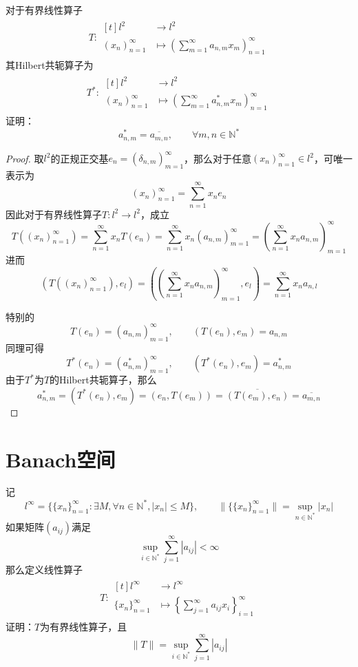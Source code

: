 \documentclass[lang = cn, scheme = chinese, 10pt]{elegantbook}
\newcommand{\N}{\mathbb{N}}  %
\begin{document}
\begin{proposition}
	对于有界线性算子
	\nonumber\begin{align}
		T:\begin{aligned}[t]
			l^2 &\longrightarrow l^2\\
			(x_n)_{n=1}^{\infty} &\longmapsto \left(\sum_{m=1}^{\infty}a_{n,m}x_m\right)_{n=1}^{\infty}
		\end{aligned}
	\end{align}
	其Hilbert共轭算子为
	\nonumber\begin{align}
		T^*:\begin{aligned}[t]
			l^2 &\longrightarrow l^2\\
			(x_n)_{n=1}^{\infty} &\longmapsto \left(\sum_{m=1}^{\infty}a^*_{n,m}x_m\right)_{n=1}^{\infty}
		\end{aligned}
	\end{align}
	证明：
	$$
	a_{n,m}^*=\overline{a_{m,n}},\qquad \forall m,n\in\N^*
	$$
\end{proposition}

\begin{proof}
	取$l^2$的正规正交基$e_n=(\delta_{n,m})_{m=1}^{\infty}$，那么对于任意$( x_n )_{n=1}^{\infty}\in l^2$，可唯一表示为
	$$
	( x_n )_{n=1}^{\infty}=\sum_{n=1}^{\infty}x_ne_n
	$$
	因此对于有界线性算子$T:l^2\to l^2$，成立
	$$
	T(( x_n )_{n=1}^{\infty})
	=\sum_{n=1}^{\infty}x_nT(e_n)
	=\sum_{n=1}^{\infty}x_n(a_{n,m})_{m=1}^{\infty}
	=\left( \sum_{n=1}^{\infty}x_na_{n,m} \right)_{m=1}^{\infty}
	$$
	进而
	$$
	(T(( x_n )_{n=1}^{\infty}),e_l)
	=\left( \left( \sum_{n=1}^{\infty}x_na_{n,m} \right)_{m=1}^{\infty},e_l\right)
	=\sum_{n=1}^{\infty}x_na_{n,l}
	$$
	
	特别的
	$$
	T(e_n)=(a_{n,m})_{m=1}^{\infty},\qquad (T(e_n),e_m)=a_{n,m}
	$$
	同理可得
	$$
	T^*(e_n)=(a^*_{n,m})_{m=1}^{\infty},\qquad (T^*(e_n),e_m)=a_{n,m}^*
	$$
	由于$T^*$为$T$的Hilbert共轭算子，那么
	$$
	a_{n,m}^*=(T^*(e_n),e_m)=(e_n,T(e_m))=\overline{(T(e_m),e_n)}=\overline{a_{m,n}}
	$$
\end{proof}

\chapter{Banach空间}

\begin{proposition}
	记
	$$
	l^\infty=\{\{x_n\}_{n=1}^{\infty}:\exists M,\forall n\in\N^*,|x_n|\le M\},\qquad 
	\|\{\{x_n\}_{n=1}^{\infty}\|=\sup_{n\in\N^*}|x_n|
	$$
	如果矩阵$(a_{ij})$满足
	$$
	\sup_{i\in\N^*}\sum_{j=1}^{\infty}|a_{ij}|<\infty
	$$
	那么定义线性算子
	\nonumber\begin{align}
		T:\begin{aligned}[t]
			l^\infty&\longrightarrow l^\infty\\
			\{x_n\}_{n=1}^{\infty}&\longmapsto \left\{ \sum_{j=1}^{\infty}a_{ij}x_i \right\}_{i=1}^{\infty}
		\end{aligned}
	\end{align}
	证明：$T$为有界线性算子，且
	$$
	\|T\|=\sup_{i\in\N^*}\sum_{j=1}^{\infty}|a_{ij}|
	$$
\end{proposition}
\end{document}
